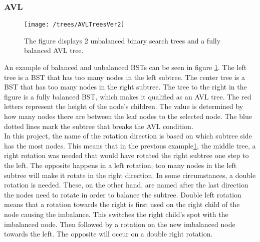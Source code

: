 \subsubsection{AVL}
\begin{figure}[H]
    \centering
    \texttt{[image: /trees/AVLTreesVer2]}    
    \caption{The figure displays 2 unbalanced binary search trees and a fully balanced AVL tree. }
    \label{fig:AVLTrees}
\end{figure}
\noindent
An example of balanced and unbalanced BSTs can be seen in figure \ref{fig:AVLTrees}. The left tree is a BST that has too many nodes in the left subtree. The center tree is a BST that has too many nodes in the right subtree. The tree to the right in the figure is a fully balanced BST, which makes it qualified as an AVL tree. The red letters represent the height of the node's children. The value is determined by how many nodes there are between the leaf nodes to the selected node. The blue dotted lines mark the subtree that breaks the AVL condition.
\\[11pt]
In this project, the name of the rotation direction is based on which subtree side has the most nodes. This means that in the previous example\ref{fig:AVLTrees}, the middle tree, a right rotation was needed that would have rotated the right subtree one step to the left. The opposite happens in a left rotation; too many nodes in the left subtree will make it rotate in the right direction. In some circumstances, a double rotation is needed. These, on the other hand, are named after the last direction the nodes need to rotate in order to balance the subtree. Double left rotation means that a rotation towards the right is first used on the right child of the node causing the imbalance. This switches the right child's spot with the imbalanced node. Then followed by a rotation on the new imbalanced node towards the left. The opposite will occur on a double right rotation.
\\[11pt]
